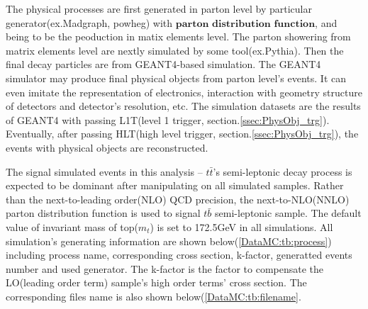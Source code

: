 		The physical processes are first generated in parton level by particular generator(ex.Madgraph\cite{Alwall:2011uj}, powheg\cite{Frixione:2007nu}) with $\textbf{parton distribution function}$, and being to be the peoduction in matix elements level. The parton showering from matrix elements level are nextly simulated by some tool(ex.Pythia\cite{Sjostrand:2014zea}). Then the final decay particles are from GEANT4-based\cite{Agostinelli:2002hh} simulation. The GEANT4 simulator may produce final physical objects from parton level's events. It can even imitate the representation of electronics, interaction with geometry structure of detectors and detector's resolution, etc. The simulation datasets are the results of GEANT4 with passing L1T(level 1 trigger, section.\ref{ssec:PhysObj_trg}). Eventually, after passing HLT(high level trigger, section.\ref{ssec:PhysObj_trg}), the events with physical objects are reconstructed.

		The signal simulated events in this analysis -- $t\bar{t}$'s semi-leptonic decay process is expected to be dominant after manipulating on all simulated samples. Rather than the next-to-leading order(NLO) QCD precision, the next-to-NLO(NNLO) parton distribution function\cite{Ball:2017nwa} is used to signal $t\bar{b}$ semi-leptonic sample. The default value of invariant mass of top($m_{t}$) is set to 172.5GeV in all simulations. All simulation's generating information are shown below(\ref{DataMC:tb:process}) including process name, corresponding cross section, k-factor, generatted events number and used generator. The k-factor is the factor to compensate the LO(leading order term) sample's high order terms' cross section. The corresponding files name is also shown below(\ref{DataMC:tb:filename}.


